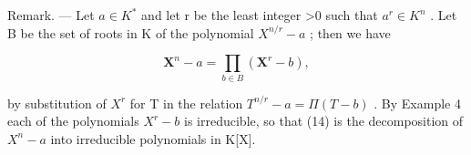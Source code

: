 Remark. --- Let \(a \in K^{*}\) and let r be the least integer \textgreater0 such that \(a^{r} \in K^{n}\) . Let B be the set of roots in K of the polynomial \(X^{n/r} - a\) ; then we have

\[
\mathbf {X} ^ {n} - a = \prod_ {b \in B} \left(\mathbf {X} ^ {r} - b\right),\tag{14}
\]

by substitution of \(X^{r}\) for T in the relation \(T^{n/r}-a=\Pi(T-b)\) . By Example 4 each of the polynomials \(X^{r}-b\) is irreducible, so that (14) is the decomposition of \(X^{n}-a\) into irreducible polynomials in K{[}X{]}.

